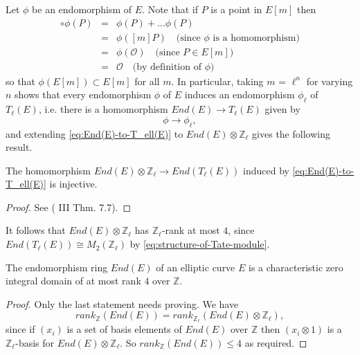 Let $\phi$ be an endomorphism of $E$.  Note that if $P$ is a point in $E[m]$ then
\begin{eqnarray*}
  [m] \circ \phi (P)&=&\phi (P) + \ldots \phi (P)\\
  &=&\phi ([m] P) \quad \text{(since $\phi$ is a homomorphism)}\\
  &=&\phi (\mathcal{O}) \quad \text{(since $P \in E[m]$)}\\
  &=&\mathcal{O} \quad \text{(by definition of $\phi$)}
\end{eqnarray*}
so that $\phi (E[m]) \subset E[m]$ for all $m$.  In particular, taking $m$ =
$\ell^{n}$ for varying $n$ shows that every endomorphism $\phi$ of $E$ induces an
endomorphism $\phi_{\ell}$ of $T_{\ell}(E)$, i.e. there is a homomorphism $End(E)
\rightarrow T_{\ell}(E)$ given by
\begin{equation}
  \label{eq:End(E)-to-T_ell(E)}
  \phi \rightarrow \phi_{\ell},
\end{equation}
and extending \eqref{eq:End(E)-to-T_ell(E)} to $End(E) \otimes \mathbb{Z}_{\ell}$ gives the following
result.

\begin{lem}
  \label{lem:End(E)-tensor-Z_ell-injects}
  The homomorphism $End(E) \otimes \mathbb{Z}_{\ell} \rightarrow End(T_{\ell}(E))$
  induced by \eqref{eq:End(E)-to-T_ell(E)} is injective.
\end{lem}
\begin{proof}
  See (\cite{silverman86} III Thm. 7.7).
\end{proof}

It follows that $End(E) \otimes \mathbb{Z}_{\ell}$ has $\mathbb{Z}_{\ell}$-rank at
most $4$, since $End(T_{\ell}(E)) \cong M_{2}(\mathbb{Z}_{\ell})$ by
\eqref{eq:structure-of-Tate-module}.

\begin{prop}
  \label{prop:rank-of-End(E)}
  The endomorphism ring $End(E)$ of an elliptic curve $E$ is a characteristic zero
  integral domain of at most rank $4$ over $\mathbb{Z}$.
\end{prop}
\begin{proof}
  Only the last statement needs proving.  We have
  \begin{equation*}
    rank_{\mathbb{Z}}(End(E)) = rank_{\mathbb{Z}_{\ell}}(End(E) \otimes \mathbb{Z}_{\ell}),
  \end{equation*}
  since if $(x_{i})$ is a set of basis elements of $End(E)$ over $\mathbb{Z}$ then
  $(x_{i} \otimes 1)$ is a $\mathbb{Z}_{\ell}$-basis for $End(E) \otimes
  \mathbb{Z}_{\ell}$.  So $rank_{\mathbb{Z}}(End(E)) \leq 4$ as required.
\end{proof}

